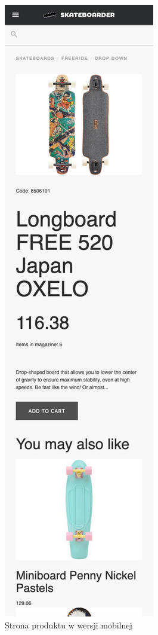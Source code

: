 \documentclass[12pt,a4paper,titlepage]{article}
\begin{document}
\begin{figure}[H]
    \centering
    \includegraphics[scale=.2]{Pics/product2.png}
    \caption{Strona produktu w wersji mobilnej}
    \label{pic:productPage2}
\end{figure}
\end{document}
